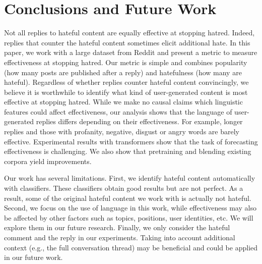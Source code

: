 \documentclass[11pt]{article}
\begin{document}
\section{Conclusions and Future Work}
Not all replies to hateful content are equally effective at stopping hatred.
Indeed, replies that counter the hateful content sometimes elicit additional hate.
In this paper, we work with a large dataset from Reddit and present a metric to measure effectiveness at stopping hatred.
Our metric is simple and combines popularity (how many posts are published after a reply)
and hatefulness (how many are hateful).
Regardless of whether replies counter hateful content convincingly,
we believe it is worthwhile to identify what kind of user-generated content is most effective at stopping hatred.
While we make no causal claims which linguistic features could affect effectiveness, 
our analysis shows that the language of user-generated replies differs depending on their effectiveness.
For example,
longer replies and those with profanity, negative, disgust or angry words are barely effective.
Experimental results with transformers show that the task of forecasting effectiveness is challenging.
We also show that pretraining and blending existing corpora yield improvements.

Our work has several limitations. 
First,  we identify hateful content automatically with classifiers.
These classifiers obtain good results but are not perfect.
As a result,
some of the original hateful content we work with is actually not hateful.
Second, we focus on the use of language in this work, while effectiveness may also be affected by other factors such as topics, positions, user identities, etc.
We will explore them in our future research.
Finally, we only consider the hateful comment and the reply in our experiments.
Taking into account additional context (e.g., the full conversation thread) may be beneficial and could be applied in our future work.





\appendix
\end{document}
